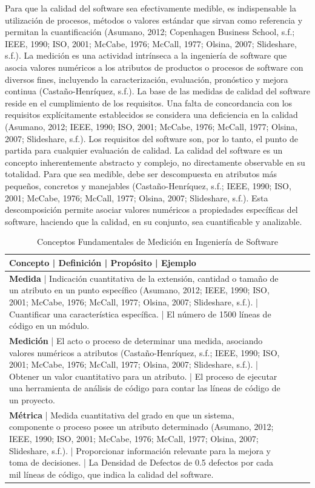 \documentclass[11pt]{article}
\begin{document}
Para que la calidad del software sea efectivamente medible, es indispensable la utilización de procesos, métodos o valores estándar que sirvan como referencia y permitan la cuantificación (Asumano, 2012; Copenhagen Business School, s.f.; IEEE, 1990; ISO, 2001; McCabe, 1976; McCall, 1977; Olsina, 2007; Slideshare, s.f.). La medición es una actividad intrínseca a la ingeniería de software que asocia valores numéricos a los atributos de productos o procesos de software con diversos fines, incluyendo la caracterización, evaluación, pronóstico y mejora continua (Castaño-Henríquez, s.f.). La base de las medidas de calidad del software reside en el cumplimiento de los requisitos. Una falta de concordancia con los requisitos explícitamente establecidos se considera una deficiencia en la calidad (Asumano, 2012; IEEE, 1990; ISO, 2001; McCabe, 1976; McCall, 1977; Olsina, 2007; Slideshare, s.f.). Los requisitos del software son, por lo tanto, el punto de partida para cualquier evaluación de calidad. La calidad del software es un concepto inherentemente abstracto y complejo, no directamente observable en su totalidad. Para que sea medible, debe ser descompuesta en atributos más pequeños, concretos y manejables (Castaño-Henríquez, s.f.; IEEE, 1990; ISO, 2001; McCabe, 1976; McCall, 1977; Olsina, 2007; Slideshare, s.f.). Esta descomposición permite asociar valores numéricos a propiedades específicas del software, haciendo que la calidad, en su conjunto, sea cuantificable y analizable.

\begin{table}[h!]
\centering
\caption{Conceptos Fundamentales de Medición en Ingeniería de Software}
\begin{tabular}{|l|l|l|l|}
\hline
Concepto | Definición | Propósito | Ejemplo \\
\hline
\textbf{Medida} | Indicación cuantitativa de la extensión, cantidad o tamaño de un atributo en un punto específico (Asumano, 2012; IEEE, 1990; ISO, 2001; McCabe, 1976; McCall, 1977; Olsina, 2007; Slideshare, s.f.). | Cuantificar una característica específica. | El número de 1500 líneas de código en un módulo. \\
\hline
\textbf{Medición} | El acto o proceso de determinar una medida, asociando valores numéricos a atributos (Castaño-Henríquez, s.f.; IEEE, 1990; ISO, 2001; McCabe, 1976; McCall, 1977; Olsina, 2007; Slideshare, s.f.). | Obtener un valor cuantitativo para un atributo. | El proceso de ejecutar una herramienta de análisis de código para contar las líneas de código de un proyecto. \\
\hline
\textbf{Métrica} | Medida cuantitativa del grado en que un sistema, componente o proceso posee un atributo determinado (Asumano, 2012; IEEE, 1990; ISO, 2001; McCabe, 1976; McCall, 1977; Olsina, 2007; Slideshare, s.f.). | Proporcionar información relevante para la mejora y toma de decisiones. | La Densidad de Defectos de 0.5 defectos por cada mil líneas de código, que indica la calidad del software. \\
\hline
\end{tabular}
\end{table}
\end{document}
